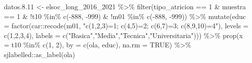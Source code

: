 \documentclass[
  12pt,
]{book}
\newenvironment{Shaded}{\begin{snugshade}}{\end{snugshade}}
\newcommand{\AttributeTok}[1]{\textcolor[rgb]{0.77,0.63,0.00}{#1}}
\newcommand{\ConstantTok}[1]{\textcolor[rgb]{0.00,0.00,0.00}{#1}}
\newcommand{\DecValTok}[1]{\textcolor[rgb]{0.00,0.00,0.81}{#1}}
\newcommand{\FloatTok}[1]{\textcolor[rgb]{0.00,0.00,0.81}{#1}}
\newcommand{\FunctionTok}[1]{\textcolor[rgb]{0.00,0.00,0.00}{#1}}
\newcommand{\NormalTok}[1]{#1}
\newcommand{\OtherTok}[1]{\textcolor[rgb]{0.56,0.35,0.01}{#1}}
\newcommand{\SpecialCharTok}[1]{\textcolor[rgb]{0.00,0.00,0.00}{#1}}
\newcommand{\StringTok}[1]{\textcolor[rgb]{0.31,0.60,0.02}{#1}}
\begin{document}
\begin{Shaded}
\begin{Highlighting}[]
\NormalTok{datos.}\FloatTok{8.11} \OtherTok{\textless{}{-}}\NormalTok{ elsoc\_long\_2016\_2021 }\SpecialCharTok{\%\textgreater{}\%} 
  \FunctionTok{filter}\NormalTok{(tipo\_atricion }\SpecialCharTok{==} \DecValTok{1} \SpecialCharTok{\&}\NormalTok{ muestra }\SpecialCharTok{==} \DecValTok{1} \SpecialCharTok{\&} \SpecialCharTok{!}\NormalTok{t10 }\SpecialCharTok{\%in\%} \FunctionTok{c}\NormalTok{(}\SpecialCharTok{{-}}\DecValTok{888}\NormalTok{, }\SpecialCharTok{{-}}\DecValTok{999}\NormalTok{) }\SpecialCharTok{\&} \SpecialCharTok{!}\NormalTok{m01 }\SpecialCharTok{\%in\%} \FunctionTok{c}\NormalTok{(}\SpecialCharTok{{-}}\DecValTok{888}\NormalTok{, }\SpecialCharTok{{-}}\DecValTok{999}\NormalTok{)) }\SpecialCharTok{\%\textgreater{}\%} 
  \FunctionTok{mutate}\NormalTok{(}\AttributeTok{educ =} \FunctionTok{factor}\NormalTok{(car}\SpecialCharTok{::}\FunctionTok{recode}\NormalTok{(m01,}
                                   \StringTok{"c(1,2,3)=1; c(4,5)=2; c(6,7)=3; c(8,9,10)=4"}\NormalTok{),}
                        \AttributeTok{levels =} \FunctionTok{c}\NormalTok{(}\DecValTok{1}\NormalTok{,}\DecValTok{2}\NormalTok{,}\DecValTok{3}\NormalTok{,}\DecValTok{4}\NormalTok{), }
                       \AttributeTok{labels =} \FunctionTok{c}\NormalTok{(}\StringTok{"Basica"}\NormalTok{,}\StringTok{"Media"}\NormalTok{,}\StringTok{"Tecnica"}\NormalTok{,}\StringTok{"Universitaria"}\NormalTok{))) }\SpecialCharTok{\%\textgreater{}\%}
  \FunctionTok{prop}\NormalTok{(}\AttributeTok{x =}\NormalTok{ t10 }\SpecialCharTok{\%in\%} \FunctionTok{c}\NormalTok{(}\DecValTok{1}\NormalTok{, }\DecValTok{2}\NormalTok{), }\AttributeTok{by =} \FunctionTok{c}\NormalTok{(ola, educ), }\AttributeTok{na.rm =} \ConstantTok{TRUE}\NormalTok{) }\SpecialCharTok{\%\textgreater{}\%} 
\NormalTok{  sjlabelled}\SpecialCharTok{::}\FunctionTok{as\_label}\NormalTok{(ola)}


\end{Highlighting}
\end{Shaded}
\end{document}
